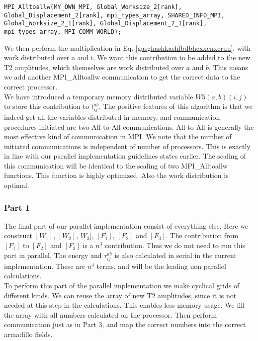 \begin{lstlisting}
MPI_Alltoallw(MY_OWN_MPI, Global_Worksize_2[rank], Global_Displacement_2[rank], mpi_types_array, SHARED_INFO_MPI, Global_Worksize_2_1[rank], Global_Displacement_2_1[rank], mpi_types_array, MPI_COMM_WORLD);
\end{lstlisting}

We then perform the multiplication in Eq. \eqref{gasghashkashfbdbhcxxcnxcruu}, with work distributed over a and i. We want this contribution to be added to the new T2 amplitudes, which themselves are work distributed over $a$ and $b$. This means we add another MPI\_Alltoallw communication to get the correct data to the correct processor. \\

We have introduced a temporary memory distributed variable $W5(a,b)(i,j)$ to store this contribution to $t_{ij}^{ab}$. The positive features of this algorithm is that we indeed get all the variables distributed in memory, and communication procedures initiated are two All-to-All communications. All-to-All is generally the most effective kind of communication in MPI. We note that the number of initiated communications is independent of number of processors. This is exactly in line with our parallel implementation guidelines states earlier. The scaling of this communication will be identical to the scaling of two MPI\_Alltoallw functions. This function is highly optimized. Also the work distribution is optimal.

\subsubsection{Part 1 \label{problem_part_ccsd_parallel}}
The final part of our parallel implementation consist of everything else. Here we construct $[W_1]$, $[W_2]$, $W_3]$, $[F_1]$, $[F_2]$ and $[F_3]$. The contribution from $[F_1]$ to $[F_2]$ and $[F_3]$ is a $n^3$ contribution. Thus we do not need to run this part in parallel. The energy and $\tau_{ij}^{ab}$ is also calculated in serial in the current implementation. These are $n^4$ terms, and will be the leading non parallel calculations. \\

To perform this part of the parallel implementation we make cyclical grids of different kinds. We can reuse the array of new T2 amplitudes, since it is not needed at this step in the calculations. This enables less memory usage. We fill the array with all numbers calculated on the processor. Then perform communication just as in Part 3, and map the correct numbers into the correct armadillo fields. \\

